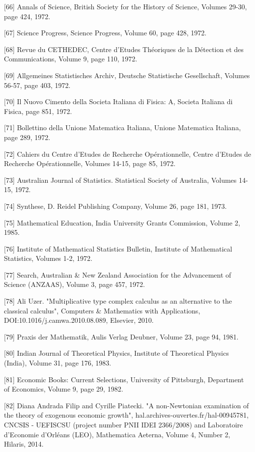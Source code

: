 \documentclass[12pt]{article}
\begin{document}
[66] Annals of Science, British Society for the History of Science, Volumes 29-30, page 424, 1972.

[67] Science Progress, Science Progress, Volume 60, page 428, 1972.

[68] Revue du CETHEDEC, Centre d'Etudes Théoriques de la Détection et des Communications, Volume 9, page 110, 1972.

[69] Allgemeines Statistisches Archiv, Deutsche Statistische Gesellschaft, Volumes 56-57, page 403, 1972. 

[70] Il Nuovo Cimento della Societa Italiana di Fisica: A, Societa Italiana di Fisica, page 851, 1972.

[71] Bollettino della Unione Matematica Italiana, Unione Matematica Italiana, page 289, 1972.

[72] Cahiers du Centre d'Etudes de Recherche Opérationnelle, Centre d'Etudes de Recherche Opérationnelle, Volumes 14-15, page 85, 1972.

[73] Australian Journal of Statistics. Statistical Society of Australia, Volumes 14-15, 1972.

[74] Synthese, D. Reidel Publishing Company, Volume 26, page 181, 1973.

[75] Mathematical Education, India University Grants Commission, Volume 2, 1985.

[76] Institute of Mathematical Statistics Bulletin, Institute of Mathematical Statistics, Volumes 1-2, 1972.

[77] Search, Australian & New Zealand Association for the Advancement of Science (ANZAAS), Volume 3, page 457, 1972.

[78] Ali Uzer. "Multiplicative type complex calculus as an alternative to the classical calculus", Computers & Mathematics with Applications, DOI:10.1016/j.camwa.2010.08.089, Elsevier, 2010.

[79] Praxis der Mathematik, Aulis Verlag Deubner, Volume 23, page 94, 1981.

[80] Indian Journal of Theoretical Physics, Institute of Theoretical Physics (India), Volume 31, page 176, 1983.

[81] Economic Books: Current Selections, University of Pittsburgh, Department of Economics, Volume 9, page 29, 1982.

[82] Diana Andrada Filip and Cyrille Piatecki. "A non-Newtonian examination of the theory of exogenous economic growth", hal.archives-ouvertes.fr/hal-00945781, CNCSIS - UEFISCSU (project number PNII IDEI 2366/2008) and Laboratoire d’Economie d’Orléans (LEO), Mathematica Aeterna, Volume 4, Number 2, Hilaris, 2014.
\end{document}
